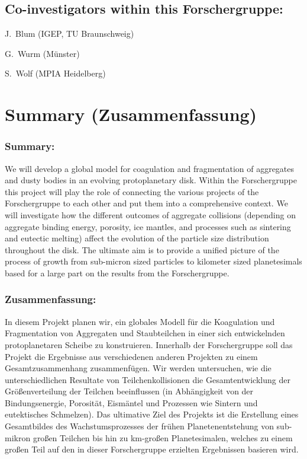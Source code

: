\subsection{Co-investigators within this Forschergruppe:}
\begin{coilist}
\item J.~Blum (IGEP, TU Braunschweig)
\item G.~Wurm (M\"unster)
\item S.~Wolf (MPIA Heidelberg)
\end{coilist}


\section{Summary (Zusammenfassung)}
\subsubsection{Summary:} 
We will develop a global model for coagulation and fragmentation of
aggregates and dusty bodies in an evolving protoplanetary disk. Within the
Forschergruppe this project will play the role of connecting the various
projects of the Forschergruppe to each other and put them into a
comprehensive context. We will investigate how the different outcomes of
aggregate collisions (depending on aggregate binding energy, porosity, ice
mantles, and processes such as sintering and eutectic melting) affect the
evolution of the particle size distribution throughout the disk.
The ultimate aim is to provide a unified picture of
the process of growth from sub-micron sized particles to kilometer sized
planetesimals based for a large part on the results from the Forschergruppe.

\subsubsection{Zusammenfassung:} 
In diesem Projekt planen wir, ein globales Modell f\"ur die Koagulation und
Fragmentation von Aggregaten und Staubteilchen in einer sich entwickelnden
protoplanetaren Scheibe zu konstruieren.  Innerhalb der Forschergruppe soll
das Projekt die Ergebnisse aus verschiedenen anderen Projekten zu einem
Gesamtzusammenhang zusammen\-f\"ugen. Wir werden untersuchen, wie die
unterschiedlichen Resultate von Teilchenkollisionen die Gesamtentwicklung
der Gr\"o{\ss}enverteilung der Teilchen beeinflussen (in Abh\"angigkeit von
der Bindungsenergie, Porosit\"at, Eism\"antel und Prozessen wie Sintern
und eutektisches Schmelzen).
Das ultimative Ziel des Projekts ist die Erstellung eines Gesamtbildes des
Wachstumsprozesses der fr\"uhen Planetenentstehung von sub-mikron gro{\ss}en
Teilchen bis hin zu km-gro{\ss}en Planetesimalen, welches zu einem
gro{\ss}en Teil auf den in dieser Forschergruppe erzielten Ergebnissen
basieren wird.

